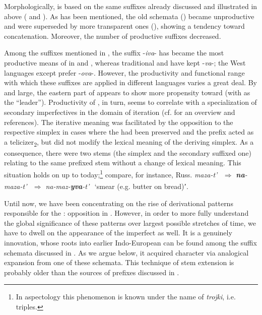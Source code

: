 \documentclass[output=paper]{langsci/langscibook}
\begin{document}
Morphologically,  is based on the same suffixes already discussed and illustrated in  above ( and ). As has been mentioned, the old schemata () became unproductive and were superseded by more transparent ones (), showing a tendency toward concatenation. Moreover, the number of productive suffixes decreased.

Among the suffixes mentioned in , the suffix -\textit{iva}- has became the most productive means of  in  and , whereas traditional  and  have kept -\textit{va}-; the West  languages except  prefer -\textit{ova}-. However, the productivity and functional range with which these suffixes are applied in different  languages varies a great deal. By and large, the eastern part of  appears to show more propensity toward  (with  as the “leader”). Productivity of , in turn, seems to correlate with a specialization of secondary imperfectives in the domain of iteration (cf. \citealt[122--125]{Arkadiev2015} for an overview and references). The iterative meaning was facilitated by the opposition to the respective simplex in cases where the  had been preserved and the prefix acted as a telicizer\textsubscript{2}, but did not modify the lexical meaning of the deriving simplex. As a consequence, there were two  stems (the simplex and the secondary suffixed one) relating to the same prefixed  stem without a change of lexical meaning. This situation holds on up to today;\footnote{In  aspectology this phenomenon is known under the name of \textit{trojki}, i.e. triples.} compare, for instance, Russ. 
\textit{maza-t’}\textsuperscript{~}{\IPFV} ${\Rightarrow}$ \textit{\textbf{na}-maza-t’}\textsuperscript{~}{\PFV} ${\Rightarrow}$ \textit{na-maz-\textbf{yva}-t’}\textsuperscript{~}{\IPFV} ‘smear (e.g. butter on bread)ʼ.


Until now, we have been concentrating on the rise of derivational patterns responsible for the : opposition in . However, in order to more fully understand the global significance of these patterns over largest possible stretches of time, we have to dwell on the appearance of the imperfect as well. It is a genuinely  innovation, whose roots into earlier Indo-European can be found among the suffix schemata discussed in . As we argue below, it acquired  character via analogical expansion from one of these schemata. This technique of stem extension is probably older than the sources of prefixes discussed in .
\end{document}
